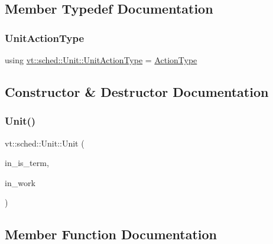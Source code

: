 \subsection{Member Typedef Documentation}
\mbox{\label{structvt_1_1sched_1_1_unit_a94de9219796a6b3134e5f6f87cc017d8}} 
\subsubsection{\texorpdfstring{Unit\+Action\+Type}{UnitActionType}}
{\footnotesize\ttfamily using \hyperlink{structvt_1_1sched_1_1_unit_a94de9219796a6b3134e5f6f87cc017d8}{vt\+::sched\+::\+Unit\+::\+Unit\+Action\+Type} =  \hyperlink{namespacevt_ae0a5a7b18cc99d7b732cb4d44f46b0f3}{Action\+Type}}



\subsection{Constructor \& Destructor Documentation}
\mbox{\label{structvt_1_1sched_1_1_unit_a7445ffcd3650520b912134ab8f2213b8}} 
\subsubsection{\texorpdfstring{Unit()}{Unit()}}
{\footnotesize\ttfamily vt\+::sched\+::\+Unit\+::\+Unit (\begin{DoxyParamCaption}\item[{bool}]{in\+\_\+is\+\_\+term,  }\item[{\hyperlink{structvt_1_1sched_1_1_unit_a94de9219796a6b3134e5f6f87cc017d8}{Unit\+Action\+Type}}]{in\+\_\+work }\end{DoxyParamCaption})\hspace{0.3cm}{\ttfamily [inline]}}



\subsection{Member Function Documentation}
\mbox{\label{structvt_1_1sched_1_1_unit_abb9552d5ca05e00ea19b8d3097ad01d9}} 

